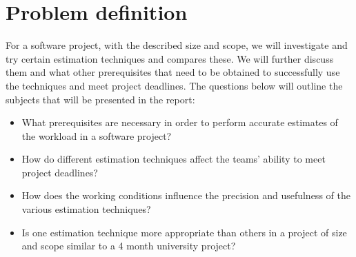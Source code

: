 \section{Problem definition}
For a software project, with the described size and scope, we will investigate and try certain estimation techniques and compares these. We will further discuss them and what other prerequisites that need to be obtained to successfully use the techniques and meet project deadlines. The questions below will outline the subjects that will be presented in the report:  
\begin{itemize}
\item What prerequisites are necessary in order to perform accurate estimates of the workload in a software project?
\item How do different estimation techniques affect the teams' ability to meet project deadlines?
\item How does the working conditions influence the precision and usefulness of the various estimation techniques?	
\item Is one estimation technique more appropriate than others in a project of size and scope similar to a 4 month university project?
\newpage

\end{itemize}
